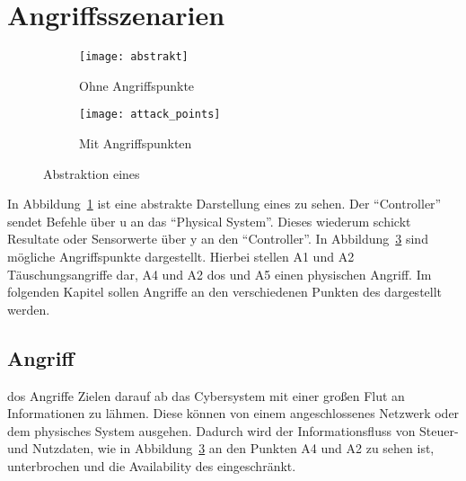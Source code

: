 
\section{Angriffsszenarien}\label{sec:angriffszenarien}

\begin{figure}
    \centering
    \begin{subfigure}[b]{0.3\textwidth}
        \texttt{[image: abstrakt]}
        \caption{Ohne Angriffspunkte}
        \label{fig:abstrakt}
    \end{subfigure}
    \qquad
    \begin{subfigure}[b]{0.4\textwidth}
        \texttt{[image: attack\_points]}
        \caption{Mit Angriffspunkten}
        \label{fig:attack_points}
    \end{subfigure}
    \caption{Abstraktion eines \cps~\cite{CAS08}}
\end{figure}

In Abbildung~\ref{fig:abstrakt} ist eine abstrakte Darstellung eines \cps zu sehen.
Der \enquote{Controller} sendet Befehle über u an das \enquote{Physical System}.
Dieses wiederum schickt Resultate oder Sensorwerte über y an den \enquote{Controller}.
In Abbildung~\ref{fig:attack_points} sind mögliche Angriffspunkte dargestellt.
Hierbei stellen A1 und A2 Täuschungsangriffe dar, A4 und A2 \gls{dos} und A5 einen physischen Angriff.
Im folgenden Kapitel sollen Angriffe an den verschiedenen Punkten des \cps dargestellt werden.

\subsection{ Angriff}\label{subsec:dos}

\gls{dos} Angriffe Zielen darauf ab das Cybersystem mit einer großen Flut an Informationen zu lähmen.
Diese können von einem angeschlossenes Netzwerk oder dem physisches System ausgehen.
Dadurch wird der Informationsfluss von Steuer- und Nutzdaten, wie in Abbildung~\ref{fig:attack_points} an den Punkten A4 und A2 zu sehen ist, unterbrochen und die Availability des \cps eingeschränkt.

